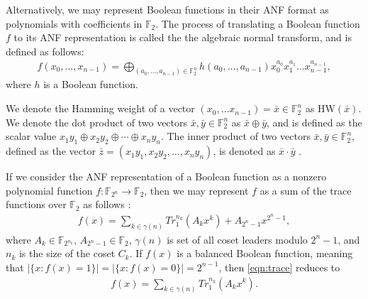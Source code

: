 Alternatively, we may represent Boolean functions in their ANF format as polynomials with coefficients in $\mathbb{F}_2$. The process of translating a Boolean function $f$ to its ANF representation is called the the algebraic normal transform, and is defined as follows:
\begin{align*}
f(x_0,\dots,x_{n-1}) = \bigoplus_{(a_0,\dots,a_{n-1}) \in \mathbb{F}_2^n} h(a_0,\dots,a_{n-1})x_0^{a_0}x_1^{a_1}\dots x_{n-1}^{a_{n-1}},
\end{align*}
where $h$ is a Boolean function. 


We denote the Hamming weight of a vector $(x_0,\dots x_{n-1}) = \bar{x} \in \mathbb{F}_2^n$ as HW$(\bar{x})$. We denote the dot product of two vectors $\bar{x}, \bar{y} \in \mathbb{F}_2^n$ as $\bar{x} \oplus \bar{y}$, and is defined as the scalar value $x_1y_1 \oplus x_2y_2 \oplus \dotsb \oplus x_ny_n$. The inner product of two vectors $\bar{x}, \bar{y} \in \mathbb{F}_2^n$, defined as the vector $\bar{z} = (x_1y_1, x_2y_2, \dots, x_ny_n)$, is denoted as $\bar{x} \cdot \bar{y}$ \cite{cusik09-BooleanFunctions}.

If we consider the ANF representation of a Boolean function as a nonzero polynomial function $f : \mathbb{F}_{2^n} \to \mathbb{F}_2$, then we may represent $f$ as a sum of the trace functions over $\mathbb{F}_2$ as follows \cite{Golomb05-1}:
\begin{align} \label{eqn:trace}
f(x) = \sum_{k \in \gamma(n)}Tr_1^{n_k}(A_kx^k) + A_{2^n - 1}x^{2^{n}-1},
\end{align}
where $A_k \in \mathbb{F}_{2^{n_k}}$, $A_{2^{n}-1} \in \mathbb{F}_2$, $\gamma(n)$ is set of all coset leaders modulo $2^n - 1$, and $n_k$ is the size of the coset $C_k$. If $f(x)$ is a balanced Boolean function, meaning that $|\{x : f(x) = 1\}| = |\{x : f(x) = 0\}| = 2^{n-1}$, then \ref{eqn:trace} reduces to
\begin{align}
f(x) = \sum_{k \in \gamma(n)}Tr_1^{n_k}(A_kx^k).
\end{align}

